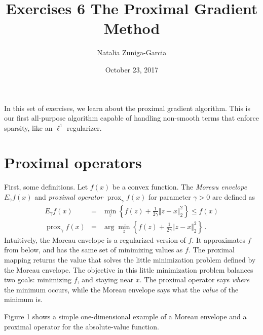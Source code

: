 \documentclass[11 pt]{article}
\author{Natalia Zuniga-Garcia}
\title{Exercises 6 The Proximal Gradient Method}
\date{October 23, 2017}
\newcommand{\prox}{ \mathop{\mathrm{prox}} }
\newcommand{\enorm}[1]{\Vert #1 \Vert_2}
\begin{document}
	
	\maketitle
	
	In this set of exercises, we learn about the proximal gradient algorithm.  This is our first all-purpose algorithm capable of handling non-smooth terms that enforce sparsity, like an $\ell^1$ regularizer.
	
	\section{Proximal operators}
	
	First, some definitions.  Let $f(x)$ be a convex function.  The \textit{Moreau envelope} $E_{\gamma} f(x)$ and \textit{proximal operator} $\prox_{\gamma} f(x)$ for parameter $\gamma > 0$ are defined as
	\begin{eqnarray}
	E_{\gamma} f(x) &=& \min_{z } \left\{f(z) + \frac{1}{2\gamma} \enorm{z - x}^2  \right\}  \leq f(x) \\
	\prox_{\gamma} f(x) &=& \arg \min_{z } \left\{  f(z)+ \frac{1}{2\gamma} \enorm{z - x}^2  \right\} \, .
	\end{eqnarray}
	Intuitively, the Moreau envelope is a regularized version of $f$.  It approximates $f$ from below, and has the same set of minimizing values as $f$.  The proximal mapping returns the value that solves the little minimization problem defined by the Moreau envelope.  The objective in this little minimization problem balances two goals: minimizing $f$, and staying near $x$.  The proximal operator says \textit{where} the minimum occurs, while the Moreau envelope says what the \textit{value} of the minimum is.
	
	Figure 1 shows a simple one-dimensional example of a Moreau envelope and a proximal operator for the absolute-value function.
	
\end{document}
